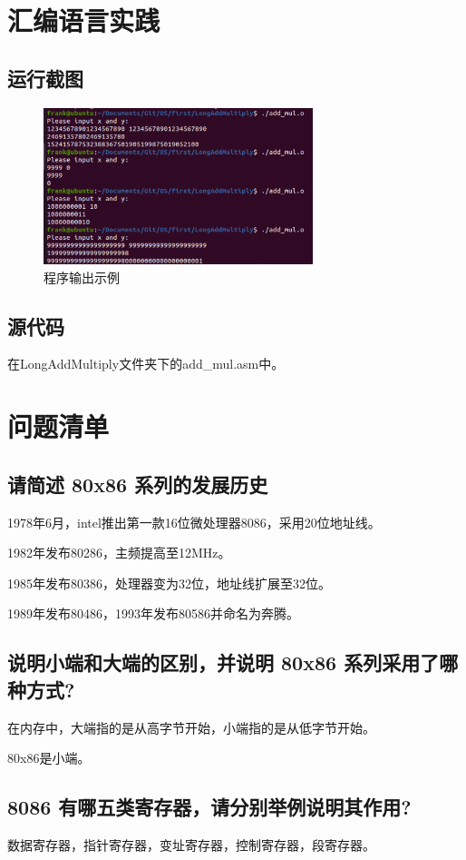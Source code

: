 \documentclass{article}
\begin{document}
\section{汇编语言实践}
\subsection{运行截图}
\begin{figure}
    \centering
    \includegraphics[width=0.7\textwidth]{add_mul_out}
    \caption{程序输出示例}
\end{figure}

\subsection{源代码}

在LongAddMultiply文件夹下的add\_mul.asm中。


\section{问题清单}
\subsection{请简述 80x86 系列的发展历史}
1978年6月，intel推出第一款16位微处理器8086，采用20位地址线。

1982年发布80286，主频提高至12MHz。

1985年发布80386，处理器变为32位，地址线扩展至32位。

1989年发布80486，1993年发布80586并命名为奔腾。
\subsection{说明小端和大端的区别，并说明 80x86 系列采用了哪种方式?}
在内存中，大端指的是从高字节开始，小端指的是从低字节开始。

80x86是小端。

\subsection{8086 有哪五类寄存器，请分别举例说明其作用?}
数据寄存器，指针寄存器，变址寄存器，控制寄存器，段寄存器。
\end{document}
